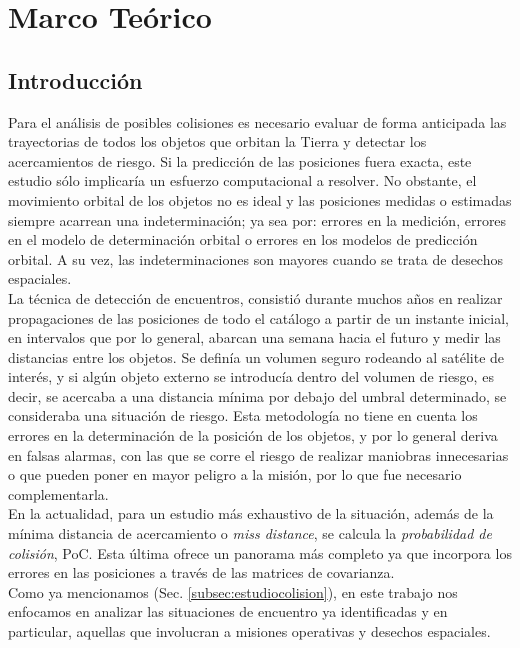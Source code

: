\chapter{Marco Teórico}
\label{chap:marcoteorico}

\section{Introducci\'on}

Para el an\'alisis de posibles colisiones es necesario evaluar de forma anticipada las trayectorias de todos los objetos que orbitan la Tierra y detectar los acercamientos de riesgo. Si la predicci\'on de las posiciones fuera exacta, este estudio s\'olo implicar\'ia un esfuerzo computacional a resolver. No obstante, el movimiento orbital de los objetos no es ideal y las posiciones medidas o estimadas siempre acarrean una indeterminaci\'on; ya sea por: errores en la medici\'on, errores en el modelo de determinaci\'on orbital o errores en los modelos de predicci\'on orbital. A su vez, las indeterminaciones son mayores cuando se trata de desechos espaciales.\\

La t\'ecnica de detecci\'on de encuentros, consisti\'o durante muchos a\~nos en realizar propagaciones de las posiciones de todo el cat\'alogo a partir de un instante inicial, en intervalos que por lo general, abarcan una semana hacia el futuro y medir las distancias entre los objetos. Se defin\'ia un volumen seguro rodeando al sat\'elite de inter\'es, y si alg\'un objeto externo se introduc\'ia dentro del volumen de riesgo, es decir, se acercaba a una distancia m\'inima por debajo del umbral determinado, se consideraba una situaci\'on de riesgo. 
Esta metodolog\'ia no tiene en cuenta los errores en la determinaci\'on de la posici\'on de los objetos, y por lo general deriva en falsas alarmas, con las que se corre el riesgo de realizar maniobras innecesarias o que pueden poner en mayor peligro a la misi\'on, por lo que fue necesario complementarla.\\

En la actualidad, para un estudio m\'as exhaustivo de la situaci\'on, adem\'as de la m\'inima distancia de acercamiento o {\it{miss distance}}, se calcula la {\it{probabilidad de colisi\'on}}, PoC.  Esta \'ultima ofrece un panorama m\'as completo ya que incorpora los errores en las posiciones a trav\'es de las matrices de covarianza.\\

Como ya mencionamos (Sec. \ref{subsec:estudiocolision}), en este trabajo nos enfocamos en analizar las situaciones de encuentro ya identificadas y en particular, aquellas que involucran a misiones operativas y desechos espaciales.\\

